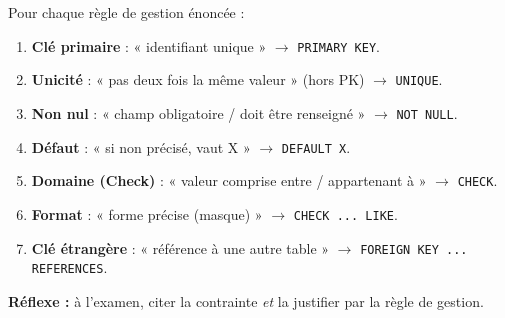 \documentclass[11pt]{article}
\begin{document}
\begin{methode}
Pour chaque règle de gestion énoncée :
\begin{enumerate}
\item \textbf{Clé primaire} : « identifiant unique » $\to$ \texttt{PRIMARY KEY}.
\item \textbf{Unicité} : « pas deux fois la même valeur » (hors PK) $\to$ \texttt{UNIQUE}.
\item \textbf{Non nul} : « champ obligatoire / doit être renseigné » $\to$ \texttt{NOT NULL}.
\item \textbf{Défaut} : « si non précisé, vaut X » $\to$ \texttt{DEFAULT X}.
\item \textbf{Domaine (Check)} : « valeur comprise entre / appartenant à » $\to$ \texttt{CHECK}.
\item \textbf{Format} : « forme précise (masque) » $\to$ \texttt{CHECK ... LIKE}.
\item \textbf{Clé étrangère} : « référence à une autre table » $\to$ \texttt{FOREIGN KEY ... REFERENCES}.
\end{enumerate}
\textbf{Réflexe :} à l'examen, citer la contrainte \emph{et} la justifier par la règle de gestion.
\end{methode}
\end{document}
